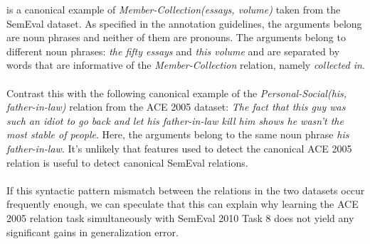 is a canonical example of \textit{Member-Collection(essays, volume)} taken from the SemEval dataset. As specified in the annotation guidelines, the arguments belong are noun phrases and neither of them are pronouns. The arguments belong to different noun phrases: \textit{the fifty essays} and \textit{this volume} and are separated by words that are informative of the \textit{Member-Collection} relation, namely \textit{collected in}.
\\\\
Contrast this with the following canonical example of the \textit{Personal-Social(his, father-in-law)} relation from the ACE 2005 dataset: \textit{The fact that this guy was such an idiot to go back and let his father-in-law kill him shows he wasn't the most stable of people}. Here, the arguments belong to the same noun phrase \textit{his father-in-law}. It's unlikely that features used to detect the canonical ACE 2005 relation is useful to detect canonical SemEval relations.
\\\\
If this syntactic pattern mismatch between the relations in the two datasets occur frequently enough, we can speculate that this can explain why learning the ACE 2005 relation task simultaneously with SemEval 2010 Task 8 does not yield any significant gains in generalization error.

